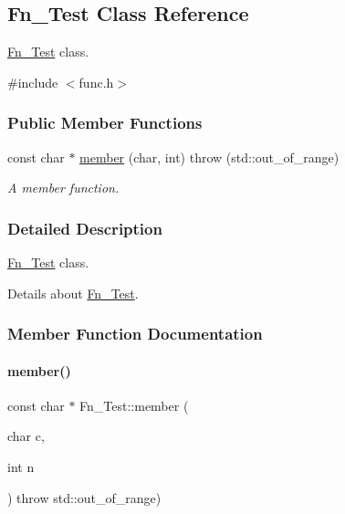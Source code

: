 \hypertarget{class_fn___test}{}\subsection{Fn\+\_\+\+Test Class Reference}
\label{class_fn___test}


\hyperlink{class_fn___test}{Fn\+\_\+\+Test} class.  




{\ttfamily \#include $<$func.\+h$>$}

\subsubsection*{Public Member Functions}
\begin{DoxyCompactItemize}
\item 
const char $\ast$ \hyperlink{class_fn___test_a823b5c9726bb8f6ece50e57ac8e3092c}{member} (char, int)  throw (std\+::out\+\_\+of\+\_\+range)
\begin{DoxyCompactList}\small\item\em A member function. \end{DoxyCompactList}\end{DoxyCompactItemize}


\subsubsection{Detailed Description}
\hyperlink{class_fn___test}{Fn\+\_\+\+Test} class. 

Details about \hyperlink{class_fn___test}{Fn\+\_\+\+Test}. 

\subsubsection{Member Function Documentation}
\hypertarget{class_fn___test_a823b5c9726bb8f6ece50e57ac8e3092c}{}\label{class_fn___test_a823b5c9726bb8f6ece50e57ac8e3092c} 
\paragraph{\texorpdfstring{member()}{member()}}
{\footnotesize\ttfamily const char $\ast$ Fn\+\_\+\+Test\+::member (\begin{DoxyParamCaption}\item[{char}]{c,  }\item[{int}]{n }\end{DoxyParamCaption}) throw  std\+::out\+\_\+of\+\_\+range) }



